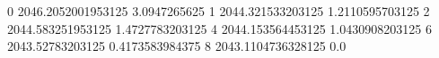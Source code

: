 0 2046.2052001953125 3.0947265625
1 2044.321533203125 1.2110595703125
2 2044.583251953125 1.4727783203125
4 2044.153564453125 1.0430908203125
6 2043.52783203125 0.4173583984375
8 2043.1104736328125 0.0
